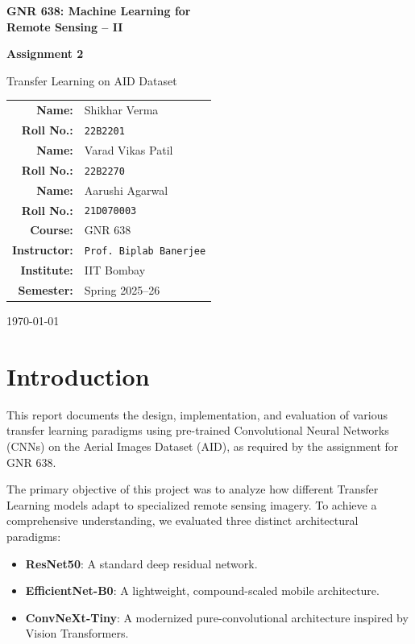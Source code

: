 \documentclass[12pt,a4paper]{article}
\begin{document}
\begin{titlepage}
\centering
\vspace*{2cm}
{\Huge\bfseries GNR 638: Machine Learning for\\Remote Sensing -- II\par}
\vspace{1cm}
{\LARGE\bfseries Assignment 2\par}
\vspace{0.5cm}
{\Large Transfer Learning on AID Dataset\par}
\vspace{2cm}

{\Large
\begin{tabular}{rl}
\textbf{Name:}        & Shikhar Verma \\[6pt]
\textbf{Roll No.:}    & \texttt{22B2201} \\[6pt]
\textbf{Name:}        & Varad Vikas Patil \\[6pt]
\textbf{Roll No.:}    & \texttt{22B2270} \\[6pt]
\textbf{Name:}        & Aarushi Agarwal \\[6pt]
\textbf{Roll No.:}    & \texttt{21D070003} \\[6pt]
\textbf{Course:}      & GNR 638 \\[6pt]
\textbf{Instructor:}  & \texttt{Prof. Biplab Banerjee} \\[6pt]
\textbf{Institute:}   & IIT Bombay \\[6pt]
\textbf{Semester:}     & Spring 2025--26 \\
\end{tabular}
}

\vfill
{\large \today}
\end{titlepage}

\tableofcontents
\newpage

\section{Introduction}
\label{sec:intro}

This report documents the design, implementation, and evaluation of various transfer learning paradigms using pre-trained Convolutional Neural Networks (CNNs) on the Aerial Images Dataset (AID), as required by the assignment for GNR 638. 

The primary objective of this project was to analyze how different Transfer Learning models adapt to specialized remote sensing imagery. To achieve a comprehensive understanding, we evaluated three distinct architectural paradigms:
\begin{itemize}[nosep]
  \item \textbf{ResNet50}: A standard deep residual network.
  \item \textbf{EfficientNet-B0}: A lightweight, compound-scaled mobile architecture.
  \item \textbf{ConvNeXt-Tiny}: A modernized pure-convolutional architecture inspired by Vision Transformers.
\end{itemize}
\end{document}

